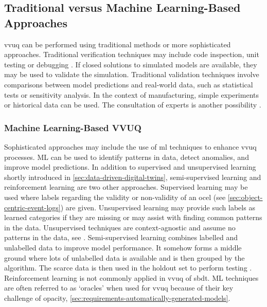 \subsection{Traditional versus Machine Learning-Based Approaches}
\label{sec:ml-approaches}

\gls{vvuq} can be performed using traditional methods or more sophisticated approaches. Traditional verification techniques may include code inspection, unit testing or debugging \autocite{maniaci2018verification}. If closed solutions to simulated models are available, they may be used to validate the simulation. Traditional validation techniques involve comparisons between model predictions and real-world data, such as statistical tests or sensitivity analysis. In the context of manufacturing, simple experiments or historical data can be used. The consultation of experts is another possibility \autocite{shao2023credibility}.

\subsubsection*{Machine Learning-Based VVUQ}

Sophisticated approaches may include the use of \gls{ml} techniques to enhance \gls{vvuq} processes. ML can be used to identify patterns in data, detect anomalies, and improve model predictions. In addition to supervised and unsupervised learning shortly introduced in \autoref{sec:data-driven-digital-twins}, semi-supervised learning and reinforcement learning are two other approaches. Supervised learning may be used where labels regarding the validity or non-validity of an \gls{ocel} (see \autoref{sec:object-centric-event-logs}) are given. Unsupervised learning may provide such labels as learned categories if they are missing or may assist with finding common patterns in the data. Unsupervised techniques are context-agnostic and assume no patterns in the data, see \textcite{hastie2009unsupervised}. Semi-supervised learning combines labelled and unlabelled data to improve model performance. It somehow forms a middle ground where lots of unlabelled data is available and is then grouped by the algorithm. The scarce data is then used in the holdout set to perform testing \autocite{learning2006semi}. Reinforcement learning is not commonly applied in \gls{vvuq} of \gls{sbdt}.
ML techniques are often referred to as `oracles' when used for \gls{vvuq} because of their key challenge of opacity, \autoref{sec:requirements-automatically-generated-models}.

